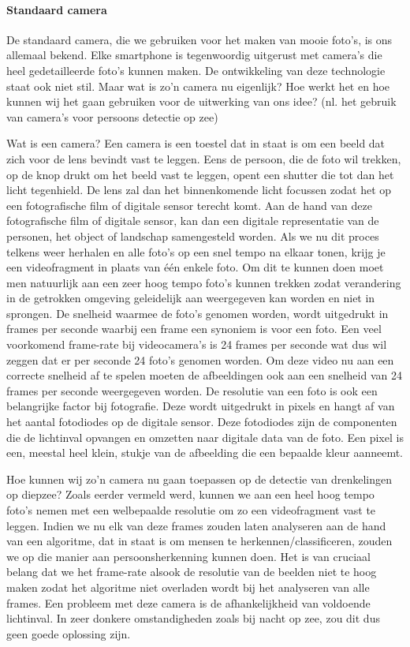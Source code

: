 \paragraph{Standaard camera}

De standaard camera, die we gebruiken voor het maken van mooie foto's, is ons allemaal bekend. Elke smartphone is tegenwoordig uitgerust met camera's die heel gedetailleerde foto's kunnen maken. De ontwikkeling van deze technologie staat ook niet stil. Maar wat is zo'n camera nu eigenlijk? Hoe werkt het en hoe kunnen wij het gaan gebruiken voor de uitwerking van ons idee? (nl. het gebruik van camera's voor persoons detectie op zee)

Wat is een camera? Een camera is een toestel dat in staat is om een beeld dat zich voor de lens bevindt vast te leggen. Eens de persoon, die de foto wil trekken, op de knop drukt om het beeld vast te leggen, opent een shutter die tot dan het licht tegenhield. De lens zal dan het binnenkomende licht focussen zodat het op een fotografische film of digitale sensor terecht komt. Aan de hand van deze fotografische film of digitale sensor, kan dan een digitale representatie van de personen, het object of landschap samengesteld worden. Als we nu dit proces telkens weer herhalen en alle foto's op een snel tempo na elkaar tonen, krijg je een videofragment in plaats van één enkele foto. Om dit te kunnen doen moet men natuurlijk aan een zeer hoog tempo foto's kunnen trekken zodat verandering in de getrokken omgeving geleidelijk aan weergegeven kan worden en niet in sprongen. De snelheid waarmee de foto's genomen worden, wordt uitgedrukt in frames per seconde waarbij een frame een synoniem is voor een foto. Een veel voorkomend frame-rate bij videocamera's is 24 frames per seconde wat dus wil zeggen dat er per seconde 24 foto's genomen worden. Om deze video nu aan een correcte snelheid af te spelen moeten de afbeeldingen ook aan een snelheid van 24 frames per seconde weergegeven worden. De resolutie van een foto is ook een belangrijke factor bij fotografie. Deze wordt uitgedrukt in pixels en hangt af van het aantal fotodiodes op de digitale sensor. Deze fotodiodes zijn de componenten die de lichtinval opvangen en omzetten naar digitale data van de foto. Een pixel is een, meestal heel klein, stukje van de afbeelding die een bepaalde kleur aanneemt. \autocite{DigitalCameras}


Hoe kunnen wij zo'n camera nu gaan toepassen op de detectie van drenkelingen op diepzee? Zoals eerder vermeld werd, kunnen we aan een heel hoog tempo foto's nemen met een welbepaalde resolutie om zo een videofragment vast te leggen. Indien we nu elk van deze frames zouden laten analyseren aan de hand van een algoritme, dat in staat is om mensen te herkennen/classificeren, zouden we op die manier aan persoonsherkenning kunnen doen. Het is van cruciaal belang dat we het frame-rate alsook de resolutie van de beelden niet te hoog maken zodat het algoritme niet overladen wordt bij het analyseren van alle frames. Een probleem met deze camera is de afhankelijkheid van voldoende lichtinval. In zeer donkere omstandigheden zoals bij nacht op zee, zou dit dus geen goede oplossing zijn. 

